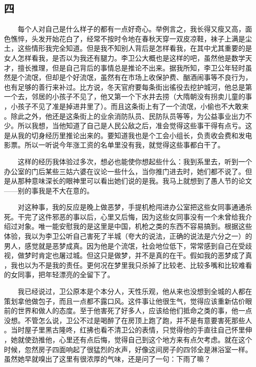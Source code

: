  
\subsection{四} 
 
 　　每个人对自己是什么样子的都有一点好奇心。举例言之，我长得又瘦又高，面 色憔悴，头发开始花白了，经常不按时令地在春秋天穿一双皮凉鞋，袜子上满是尘 土，这些情形我完全知道。但是我不知别人背后是怎样看我，在其中尤其重要的是 女人怎样看我，是否以为我还有腿力。李卫公大概也是这样的吧，虽然他是数学天 才，擅长推理，但是自己背后的事情总是推论不出来。据我所知，李卫公年轻时虽 然是个流氓，但却是个好流氓，虽然有在市场上收保护费、酗酒闹事等不良行为， 也有足够的善行来补过。比方说，冬天官府要每条街出徭役去挖护城河，他总是第 一个去，邻居的小孩子不见了，他又第一个下水井去捞（大隋朝没有拐卖儿童的事 ，小孩子不见了准是掉进井里了）。而且这条街上有了一个流氓，小偷也不大敢来 。除此之外，他还是这条街上的业余消防队员、民防队员等等，为公益事业出力不 少。所以我想，当他知道了自己是人民公敌之后，准会觉得这些事干得有点亏。这 是从我的切身经历里推论出来的。要知道我也是个工会小组长，负责收会费和发电 影票。所以一听说今年涨工资的名单里没有我，就觉得这些事都白干了。

 　　这样的经历我体验过多次，想必也能使你想起些什么：我到系里去，听到一个 办公室的门后某些三姑六婆在议论一些什么，当你推门进去时，她们都不说了。但 是从那种意味深长的眼神里可以看出她们说的是我。我马上就想到了愚人节的论文 ——别的事我是不大在意的。

 　　对这种事，我的反应是晚上做恶梦，手提机枪闯进办公室把这些女同事通通杀 死。干完了这件邪恶的事以后，心里又后悔，因为这些女同事没有一个未曾给我介 绍过对象。唯一能安慰我的是这里是中国，机枪之类的东西不容易搞到。根据这些 体验，我以为李卫公听自己害死了半城（夸大的说法，正确的说法是六分之一）的 男人，感觉就是恶梦成真。因为他是个流氓，社会地位低下，常常感到自己在受歧 视，做梦时肯定也屠过城。但这只是做梦，并不是真的在干。假如我的恶梦成了真 ，我也以为不是我的责任。更何况在梦里我只杀掉了比较老、比较多嘴和比较难看 的女同事，把年轻漂亮的全留下了。

 　　我已经说过，卫公原本是个本分人，天性乐观，他从来也没想到全城的人都在 策划拿他做包子，而且一点都不露口风。这件事让他很生气，觉得应该重新估价眼 前的世界和做人的态度。至于他害死了好多人，应该给他们抵命之类的事，他一点 没想。不管怎么说，卫公不过是喝醉了在房顶上跑了跑，并不是有意要害死那些人 。当时屋子里黑古隆咚，红拂也看不清卫公的表情，只觉得他的手直往自己怀里伸 ，她就使劲推他，心里还有点后悔，觉得自己到这个地方来有点欠考虑。就在这个 时候，忽然房子四面响起了很猛烈的水声，好像这间房子的四邻全是淋浴室一样。 虽然她早就嗅出了这里有很浓厚的气味，还是问了一句：下雨了嘛？

